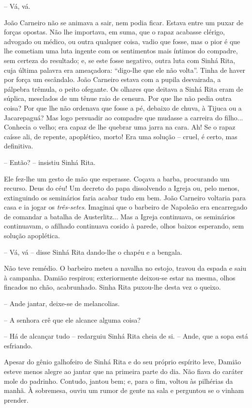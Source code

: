-- Vá, vá.

João Carneiro não se animava a sair, nem podia ficar. Estava entre um
puxar de forças opostas. Não lhe importava, em suma, que o rapaz
acabasse clérigo, advogado ou médico, ou outra qualquer coisa, vadio que
fosse, mas o pior é que lhe cometiam uma luta ingente com os sentimentos
mais íntimos do compadre, sem certeza do resultado; e, se este fosse
negativo, outra luta com Sinhá Rita, cuja última palavra era ameaçadora:
``digo-lhe que ele não volta''. Tinha de haver por força um escândalo.
João Carneiro estava com a pupila desvairada, a pálpebra trêmula, o
peito ofegante. Os olhares que deitava a Sinhá Rita eram de súplica,
mesclados de um tênue raio de censura. Por que lhe não pedia outra
coisa? Por que lhe não ordenava que fosse a pé, debaixo de chuva, à
Tijuca ou a Jacarepaguá? Mas logo persuadir ao compadre que mudasse a
carreira do filho... Conhecia o velho; era capaz de lhe quebrar uma
jarra na cara. Ah! Se o rapaz caísse ali, de repente, apoplético, morto!
Era uma solução -- cruel, é certo, mas definitiva.

-- Então? -- insistiu Sinhá Rita.

Ele fez-lhe um gesto de mão que esperasse. Coçava a barba, procurando um
recurso. Deus do céu! Um decreto do papa dissolvendo a Igreja ou, pelo
menos, extinguindo os seminários faria acabar tudo em bem. João Carneiro
voltaria para casa e ia jogar os \emph{três-setes}. Imaginai que o
barbeiro de Napoleão era encarregado de comandar a batalha de
Austerlitz... Mas a Igreja continuava, os seminários continuavam, o
afilhado continuava cosido à parede, olhos baixos esperando, sem solução
apoplética.

-- Vá, vá -- disse Sinhá Rita dando-lhe o chapéu e a bengala.

Não teve remédio. O barbeiro meteu a navalha no estojo, travou da espada
e saiu à campanha. Damião respirou; exteriormente deixou-se estar na
mesma, olhos fincados no chão, acabrunhado. Sinha Rita puxou-lhe desta
vez o queixo.

-- Ande jantar, deixe-se de melancolias.

-- A senhora crê que ele alcance alguma coisa?

-- Há de alcançar tudo -- redarguiu Sinhá Rita cheia de si. -- Ande, que
a sopa está esfriando.

Apesar do gênio galhofeiro de Sinhá Rita e do seu próprio espírito leve,
Damião esteve menos alegre ao jantar que na primeira parte do dia. Não
fiava do caráter mole do padrinho. Contudo, jantou bem; e, para o fim,
voltou às pilhérias da manhã. À sobremesa, ouviu um rumor de gente na
sala e perguntou se o vinham prender.

